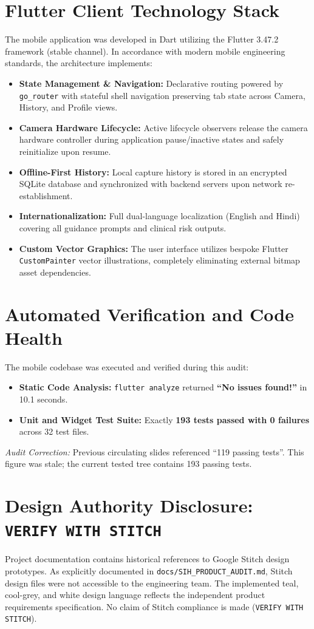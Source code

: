 \documentclass[11pt,a4paper]{report}
\newcommand{\artifact}[1]{\texttt{\footnotesize #1}}
\begin{document}
\section{Flutter Client Technology Stack}
The mobile application was developed in Dart utilizing the Flutter 3.47.2 framework (stable channel). In accordance with modern mobile engineering standards, the architecture implements:
\begin{itemize}
  \item \textbf{State Management \& Navigation:} Declarative routing powered by \texttt{go\_router} with stateful shell navigation preserving tab state across Camera, History, and Profile views.
  \item \textbf{Camera Hardware Lifecycle:} Active lifecycle observers release the camera hardware controller during application pause/inactive states and safely reinitialize upon resume.
  \item \textbf{Offline-First History:} Local capture history is stored in an encrypted SQLite database and synchronized with backend servers upon network re-establishment.
  \item \textbf{Internationalization:} Full dual-language localization (English and Hindi) covering all guidance prompts and clinical risk outputs.
  \item \textbf{Custom Vector Graphics:} The user interface utilizes bespoke Flutter \texttt{CustomPainter} vector illustrations, completely eliminating external bitmap asset dependencies.
\end{itemize}

\section{Automated Verification and Code Health}
The mobile codebase was executed and verified during this audit:
\begin{itemize}
  \item \textbf{Static Code Analysis:} \texttt{flutter analyze} returned \textbf{``No issues found!''} in 10.1 seconds.
  \item \textbf{Unit and Widget Test Suite:} Exactly \textbf{193 tests passed with 0 failures} across 32 test files.
\end{itemize}
\textit{Audit Correction:} Previous circulating slides referenced ``119 passing tests''. This figure was stale; the current tested tree contains 193 passing tests.

\section{Design Authority Disclosure: \texttt{VERIFY WITH STITCH}}
Project documentation contains historical references to Google Stitch design prototypes. As explicitly documented in \artifact{docs/SIH\_PRODUCT\_AUDIT.md}, Stitch design files were not accessible to the engineering team. The implemented teal, cool-grey, and white design language reflects the independent product requirements specification. No claim of Stitch compliance is made (\texttt{VERIFY WITH STITCH}).
\end{document}
